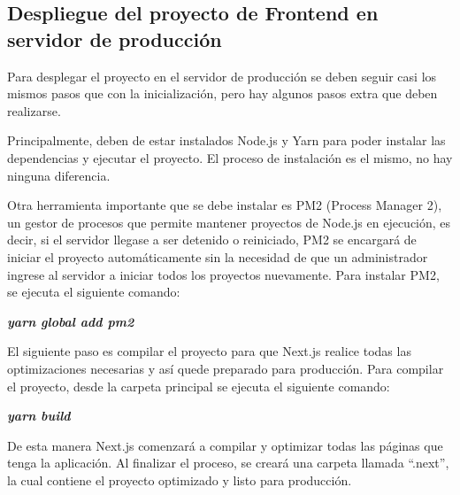 \subsection{Despliegue del proyecto de Frontend en servidor de producción}
Para desplegar el proyecto en el servidor de producción se deben seguir casi los mismos pasos que con la inicialización, pero hay algunos pasos extra que deben realizarse.

Principalmente, deben de estar instalados Node.js y Yarn para poder instalar las dependencias y ejecutar el proyecto. El proceso de instalación es el mismo, no hay ninguna diferencia.

Otra herramienta importante que se debe instalar es PM2 (Process Manager 2), un gestor de procesos que permite mantener proyectos de Node.js en ejecución, es decir, si el servidor llegase a ser detenido o reiniciado, PM2 se encargará de iniciar el proyecto automáticamente sin la necesidad de que un administrador ingrese al servidor a iniciar todos los proyectos nuevamente. Para instalar PM2, se ejecuta el siguiente comando:
    \begin{center}
        \textbf{
            \emph{
                yarn global add pm2
                }
            }
    \end{center}
El siguiente paso es compilar el proyecto para que Next.js realice todas las optimizaciones necesarias y así quede preparado para producción. Para compilar el proyecto, desde la carpeta principal se ejecuta el siguiente comando:
    \begin{center}
        \textbf{
            \emph{
                yarn build
                }
            }
    \end{center}
De esta manera Next.js comenzará a compilar y optimizar todas las páginas que tenga la aplicación. Al finalizar el proceso, se creará una carpeta llamada ``.next'', la cual contiene el proyecto optimizado y listo para producción.

